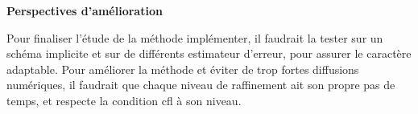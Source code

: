 \documentclass[12pt]{article}
\begin{document}
\textbf{Perspectives d'amélioration}

Pour finaliser l'étude de la méthode implémenter, il faudrait la tester sur un schéma implicite et sur de différents estimateur d'erreur, pour assurer le caractère adaptable.
Pour améliorer la méthode et éviter de trop fortes diffusions numériques, il faudrait que chaque niveau de raffinement ait son propre pas de temps, et respecte la condition cfl à son niveau.










\newpage
\printbibliography
\end{document}
